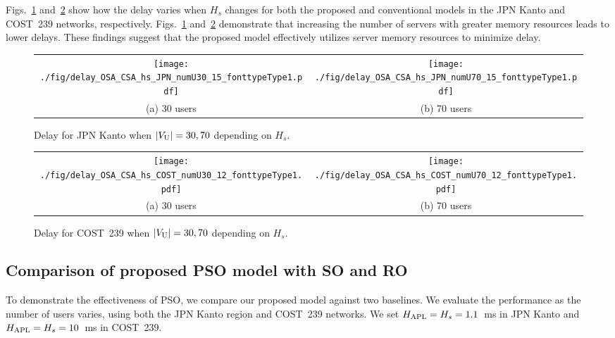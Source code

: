 \documentclass[conference]{IEEEtran}
\begin{document}
\begin{CJK}{UTF8}{ipxm}
Figs.~\ref{fig:delay_OSA_CSA_hs_JPN} and~\ref{fig:delay_OSA_CSA_hs_COST} show how the delay varies when $H_s$ changes for both the proposed and conventional models in the JPN Kanto and COST~239 networks, respectively.
Figs.~\ref{fig:delay_OSA_CSA_hs_JPN} and~\ref{fig:delay_OSA_CSA_hs_COST} demonstrate that increasing the number of servers with greater memory resources leads to lower delays. 
These findings suggest that the proposed model effectively utilizes server memory resources to minimize delay.
\begin{figure}[t]
  \begin{center}
      \begin{tabular}{cc}
      \texttt{[image: ./fig/delay\_OSA\_CSA\_hs\_JPN\_numU30\_15\_fonttypeType1.pdf]} &
      \texttt{[image: ./fig/delay\_OSA\_CSA\_hs\_JPN\_numU70\_15\_fonttypeType1.pdf]} \\
      (a) 30 users & (b) 70 users
      \end{tabular}
  \end{center}
       \vspace{-0.3cm}
  \caption{Delay for JPN Kanto when $|V_{\rm U}| = 30, 70$ depending on $H_s$.}
  \label{fig:delay_OSA_CSA_hs_JPN}
\end{figure}
\begin{figure}[t]
  \begin{center}
      \begin{tabular}{cc}
      \texttt{[image: ./fig/delay\_OSA\_CSA\_hs\_COST\_numU30\_12\_fonttypeType1.pdf]} &
      \texttt{[image: ./fig/delay\_OSA\_CSA\_hs\_COST\_numU70\_12\_fonttypeType1.pdf]} \\
      (a) 30 users & (b) 70 users
      \end{tabular}
  \end{center}
       \vspace{-0.3cm}
  \caption{Delay for COST~239 when $|V_{\rm U}| = 30, 70$ depending on $H_s$.}
  \label{fig:delay_OSA_CSA_hs_COST}
\end{figure}

\subsection{Comparison of proposed PSO model with SO and RO}
To demonstrate the effectiveness of PSO, we compare our proposed model against two baselines.
We evaluate the performance as the number of users varies, using both the JPN Kanto region and COST~239 networks.
We set $H_{\rm APL} = H_s = 1.1$~ms in JPN Kanto and $H_{\rm APL} = H_s = 10$~ms in COST~239.


\end{CJK}
\end{document}
